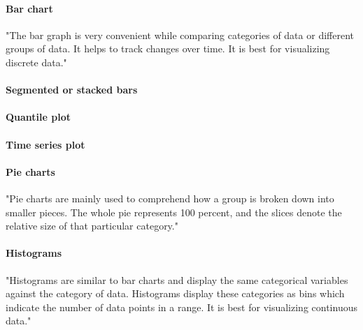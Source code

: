 \documentclass[article]{jss}
\begin{document}
\paragraph{Bar chart} 
"The bar graph is very convenient while comparing categories of data or different groups of data. It helps to track changes over time. It is best for visualizing discrete data."

\paragraph{Segmented or stacked bars} 



\paragraph{Quantile plot} 



\paragraph{Time series plot} 

\paragraph{Pie charts} 
"Pie charts are mainly used to comprehend how a group is broken down into smaller pieces. The whole pie represents 100 percent, and the slices denote the relative size of that particular category."


\paragraph{Histograms} 
"Histograms are similar to bar charts and display the same categorical variables against the category of data. Histograms display these categories as bins which indicate the number of data points in a range. It is best for visualizing continuous data."
\end{document}
